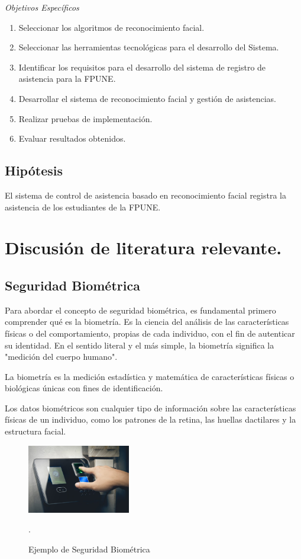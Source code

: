 \documentclass[10pt,a4paper]{article}
\begin{document}
\begin{multicols}{2}
\vspace{0.5cm}
\textit{Objetivos Específicos}
\begin{enumerate}
    \item Seleccionar los algoritmos de reconocimiento facial.
    \item Seleccionar las herramientas tecnológicas para el desarrollo del Sistema.
    \item Identificar los requisitos para el desarrollo del sistema de registro de asistencia para la FPUNE.
    \item Desarrollar el sistema de reconocimiento facial y gestión de asistencias.
    \item Realizar pruebas de implementación.
    \item Evaluar resultados obtenidos.
\end{enumerate}

\subsection{Hipótesis}
El sistema de control de asistencia basado en reconocimiento facial registra
la asistencia de los estudiantes de la FPUNE.

\section{Discusión de literatura relevante.}
\subsection{Seguridad Biométrica}

Para abordar el concepto de seguridad biométrica, es fundamental primero comprender qué es la biometría. Es la ciencia del análisis de las características físicas o del comportamiento, propias de cada individuo, con el fin de autenticar su identidad. En el sentido literal y el más simple, la biometría significa la "medición del cuerpo humano"\cite{avastSeguridadBiometrica}.

La biometría es la medición estadística y matemática de características
físicas o biológicas únicas con fines de identificación\cite{thalesBiometria}.

Los datos biométricos son cualquier tipo de información sobre las características físicas de un individuo, como los patrones de la retina, las huellas dactilares y la estructura facial\cite{thalesBiometria}.

\begin{figure}[H]
  \centering
  \includegraphics[width=0.4\textwidth]{imagenes_doc/segu_biometrica_1.jpg}
  \caption{Ejemplo de Seguridad Biométrica}\cite{beesafe_accesscontrol}.
  \label{fig:logo}
\end{figure}
\vspace{-0.5cm}


\end{multicols}
\end{document}
